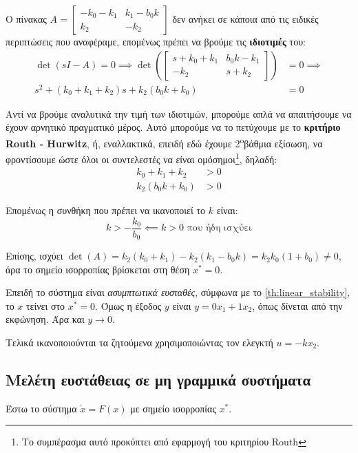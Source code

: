 \documentclass[11pt,a4paper,notitlepage,fleqn]{article}
\begin{document}
\begin{exercise}[Παράδειγμα]
	Ο πίνακας \( A=\left[\begin{matrix}
	-k_0 - k_1 & k_1-b_0k \\
	k_2 & -k_2
	\end{matrix}\right] \) δεν ανήκει σε κάποια από τις ειδικές περιπτώσεις
	που αναφέραμε, επομένως πρέπει να βρούμε τις \textbf{ιδιοτιμές} του:
	\begin{align*}
	\det(sI-A) = 0 \implies \det\left(\left[\begin{matrix}
	s+k_0+k_1 & b_0k-k_1 \\ -k_2 & s+k_2 \end{matrix}
	\right]\right) &= 0 \implies \\
	s^2 + (k_0+k_1+k_2)s + k_2(b_0k + k_0) &= 0
	\end{align*}

	Αντί να βρούμε αναλυτικά την τιμή των ιδιοτιμών, μπορούμε απλά να
	απαιτήσουμε να έχουν αρνητικό πραγματικό μέρος. Αυτό μπορούμε να το
	πετύχουμε με το \textbf{κριτήριο Routh - Hurwitz}, ή, εναλλακτικά, επειδή
	εδώ έχουμε 2\textsuperscript{o}βάθμια εξίσωση, να φροντίσουμε ώστε όλοι
	οι συντελεστές να είναι ομόσημοι\footnote{Το συμπέρασμα αυτό προκύπτει από εφαρμογή του κριτηρίου Routh}, δηλαδή:
	\begin{align*}
		k_0+k_1+k_2 &> 0\\
		k_2(b_0k+k_0) &> 0
	\end{align*}

	Επομένως η συνθήκη που πρέπει να ικανοποιεί το \( k \) είναι:
	\[
	k > -\frac{k_0}{b_0} \impliedby k>0 \text{ που ήδη ισχύει}
	\]

	Επίσης, ισχύει \( \det(A) = k_2(k_0+k_1)-k_2(k_1-b_0k) = k_2k_0(1+b_0) \neq 0 \), άρα το σημείο ισορροπίας βρίσκεται στη θέση \( x^* = 0 \).

	Επειδή το σύστημα είναι \textit{ασυμπτωτικά ευσταθές}, σύμφωνα
	με το \autoref{th:linear_stability}, το
	\( x \) τείνει στο \( x^* = 0 \). Όμως η έξοδος \( y \) είναι \( y=0x_1 + 1x_2 \), όπως δίνεται από την εκφώνηση.
	Άρα και \( y\to 0 \).

	Τελικά ικανοποιούνται τα ζητούμενα χρησιμοποιώντας τον ελεγκτή \( u=-kx_2 \).
\end{exercise}

\subsection{Μελέτη ευστάθειας σε μη γραμμικά συστήματα}
Έστω το σύστημα \( \dot x = F(x) \) με σημείο ισορροπίας \( x^* \).
\end{document}
